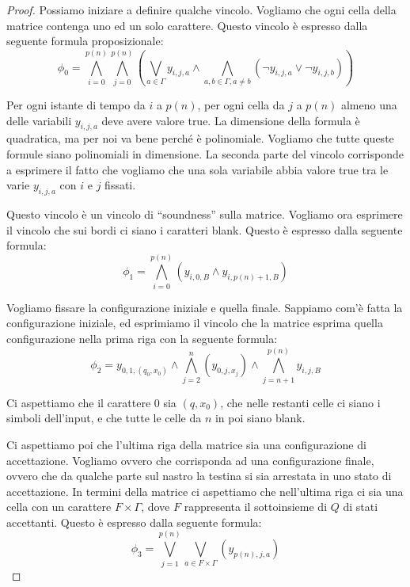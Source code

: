 \begin{proof}
    Possiamo iniziare a definire qualche vincolo. Vogliamo che ogni cella della matrice contenga uno ed
    un solo carattere. Questo vincolo è espresso dalla seguente formula proposizionale:
    \begin{equation*}
        \phi_{0} = \bigwedge_{i=0}^{p(n)}\bigwedge_{j=0}^{p(n)}\left(\bigvee_{a \in \Gamma}
            y_{i,j,a}
        \land \bigwedge_{a,b \in \Gamma,a \not= b}(\lnot y_{i,j,a} \lor \lnot y_{i,j,b})\right)
    \end{equation*}
    
    Per ogni istante di tempo da $i$ a $p(n)$, per ogni cella da $j$ a $p(n)$ almeno una delle
    variabili $y_{i,j,a}$ deve avere valore true. La dimensione della formula è quadratica, ma per
    noi va bene perché è polinomiale. Vogliamo che tutte queste formule siano polinomiali in
    dimensione. La seconda parte del vincolo corrisponde a esprimere il fatto che vogliamo che una
    sola variabile abbia valore true tra le varie $y_{i,j,a}$ con $i$ e $j$ fissati.

    Questo vincolo è un vincolo di ``soundness'' sulla matrice. Vogliamo ora esprimere il vincolo che
    sui bordi ci siano i caratteri blank. Questo è espresso dalla seguente formula:
    \begin{equation*}
        \phi_{1} = \bigwedge_{i=0}^{p(n)}(y_{i,0,B} \land y_{i,p(n)+1,B})
    \end{equation*}

    Vogliamo fissare la configurazione iniziale e quella finale. Sappiamo com'è fatta la configurazione
    iniziale, ed esprimiamo il vincolo che la matrice esprima quella configurazione nella prima riga con
    la seguente formula:
    \begin{equation*}
        \phi_{2} = y_{0,1,(q_{0},x_{0})} \land \bigwedge_{j=2}^{n}(y_{0,j,x_{j}}) \land
        \bigwedge_{j=n+1}^{p(n)}y_{i,j,B}
    \end{equation*}

    Ci aspettiamo che il carattere 0 sia $(q,x_{0})$, che nelle restanti celle ci siano i simboli
    dell'input, e che tutte le celle da $n$ in poi siano blank.

    Ci aspettiamo poi che l'ultima riga della matrice sia una configurazione di accettazione.
    Vogliamo ovvero che corrisponda ad una configurazione finale, ovvero che da qualche parte sul
    nastro la testina si sia arrestata in uno stato di accettazione. In termini della matrice ci
    aspettiamo che nell'ultima riga ci sia una cella con un carattere $F \times \Gamma$, dove $F$
    rappresenta il sottoinsieme di $Q$ di stati accettanti. Questo è espresso dalla seguente
    formula:
    \begin{equation*}
        \phi_{3} = \bigvee_{j={1}}^{p(n)}\bigvee_{a \in F \times \Gamma}(y_{p(n),j,a})
    \end{equation*}


\end{proof}
